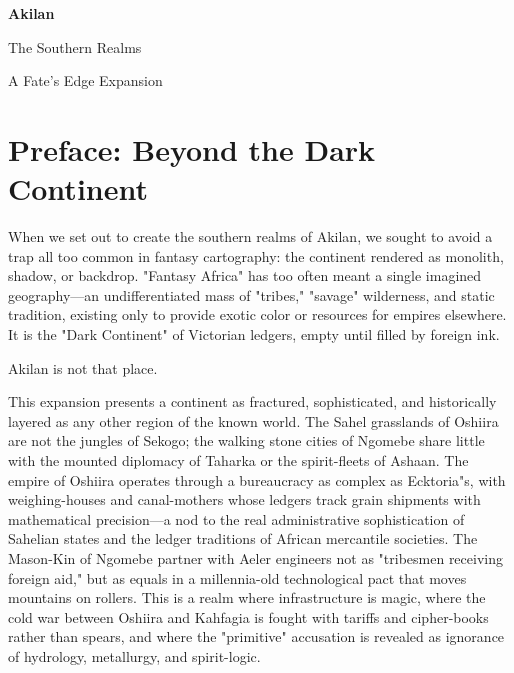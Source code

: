\documentclass[11pt]{book}
\begin{document}
\frontmatter
\begin{titlepage}
\centering
\vspace*{2cm}
{\huge\bfseries Akilan\par}
\vspace{0.5cm}
{\Large The Southern Realms\par}
\vspace{2cm}
{\large A Fate's Edge Expansion\par}
\vspace{1.5cm}
\vfill
\end{titlepage}

\chapter*{Preface: Beyond the Dark Continent}

When we set out to create the southern realms of Akilan, we sought to avoid a trap all too common in fantasy cartography: the continent rendered as monolith, shadow, or backdrop. "Fantasy Africa" has too often meant a single imagined geography---an undifferentiated mass of "tribes," "savage" wilderness, and static tradition, existing only to provide exotic color or resources for empires elsewhere. It is the "Dark Continent" of Victorian ledgers, empty until filled by foreign ink.

Akilan is not that place.

This expansion presents a continent as fractured, sophisticated, and historically layered as any other region of the known world. The Sahel grasslands of Oshiira are not the jungles of Sekogo; the walking stone cities of Ngomebe share little with the mounted diplomacy of Taharka or the spirit-fleets of Ashaan. The empire of Oshiira operates through a bureaucracy as complex as Ecktoria"s, with weighing-houses and canal-mothers whose ledgers track grain shipments with mathematical precision---a nod to the real administrative sophistication of Sahelian states and the ledger traditions of African mercantile societies. The Mason-Kin of Ngomebe partner with Aeler engineers not as "tribesmen receiving foreign aid," but as equals in a millennia-old technological pact that moves mountains on rollers. This is a realm where infrastructure is magic, where the cold war between Oshiira and Kahfagia is fought with tariffs and cipher-books rather than spears, and where the "primitive" accusation is revealed as ignorance of hydrology, metallurgy, and spirit-logic.
\end{document}
